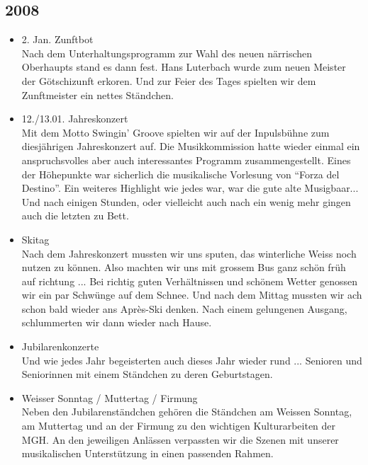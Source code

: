 \subsection{2008}

\begin{history}


    \begin{itemize}

        \item 2. Jan. Zunftbot\\
              Nach dem Unterhaltungsprogramm zur Wahl des neuen närrischen Oberhaupts
              stand es dann fest. Hans Luterbach wurde zum neuen Meister der
              Götschizunft erkoren. Und zur Feier des Tages spielten wir dem
              Zunftmeister ein nettes Ständchen.

        \item 12./13.01. Jahreskonzert\\

              Mit dem Motto Swingin' Groove spielten wir auf der Inpulsbühne zum
              diesjährigen Jahreskonzert auf. Die Musikkommission hatte wieder einmal
              ein anspruchsvolles aber auch interessantes Programm zusammengestellt.
              Eines der Höhepunkte war sicherlich die musikalische Vorlesung von
              \enquote{Forza del Destino}. Ein weiteres Highlight wie jedes war, war
              die gute alte Musigbaar... Und nach einigen Stunden, oder vielleicht
              auch nach ein wenig mehr gingen auch die letzten zu Bett.

        \item Skitag\\
              Nach dem Jahreskonzert mussten wir uns sputen, das winterliche Weiss
              noch nutzen zu können. Also machten wir uns mit grossem Bus ganz schön
              früh auf richtung ... Bei richtig guten Verhältnissen und schönem Wetter
              genossen wir ein par Schwünge auf dem Schnee. Und nach dem Mittag
              mussten wir ach schon bald wieder ans Après-Ski denken. Nach einem
              gelungenen Ausgang, schlummerten wir dann wieder nach Hause.

        \item Jubilarenkonzerte\\
              Und wie jedes Jahr begeisterten auch dieses Jahr wieder rund ...
              Senioren und Seniorinnen mit einem Ständchen zu deren Geburtstagen.

        \item Weisser Sonntag / Muttertag / Firmung\\
              Neben den Jubilarenständchen gehören die Ständchen am Weissen Sonntag,
              am Muttertag und an der Firmung zu den wichtigen Kulturarbeiten der MGH.
              An den jeweiligen Anlässen verpassten wir die Szenen mit unserer
              musikalischen Unterstützung in einen passenden Rahmen.


\end{itemize}
\end{history}
